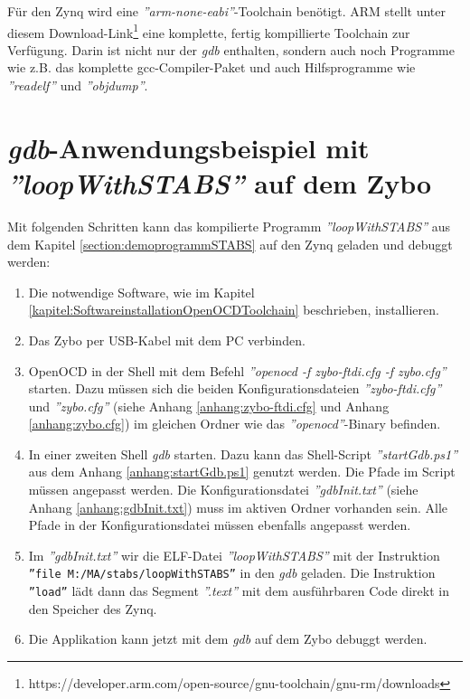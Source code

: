 Für den Zynq wird eine \textit{''arm-none-eabi''}-Toolchain benötigt.
ARM stellt unter diesem Download-Link\footnote{https://developer.arm.com/open-source/gnu-toolchain/gnu-rm/downloads} eine komplette, fertig kompillierte Toolchain zur Verfügung.
Darin ist nicht nur der \textit{gdb} enthalten, sondern auch noch Programme wie z.B. das komplette gcc-Compiler-Paket und auch Hilfsprogramme wie \textit{''readelf''} und \textit{''objdump''}.




\section{\textit{gdb}-Anwendungsbeispiel mit \textit{''loopWithSTABS''} auf dem Zybo}
\label{section:anwendungsbeispielGdb}
Mit folgenden Schritten kann das kompilierte Programm \textit{''loopWithSTABS''} aus dem Kapitel \ref{section:demoprogrammSTABS} auf den Zynq geladen und debuggt werden:

\begin{enumerate}
	\item Die notwendige Software, wie im Kapitel \ref{kapitel:SoftwareinstallationOpenOCDToolchain} beschrieben, installieren.
	\item Das Zybo per USB-Kabel mit dem PC verbinden.
	\item OpenOCD in der Shell mit dem Befehl \textit{''openocd -f zybo-ftdi.cfg -f zybo.cfg''} starten.
	       Dazu müssen sich die beiden Konfigurationsdateien \textit{''zybo-ftdi.cfg''} und \textit{''zybo.cfg''} (siehe Anhang \ref{anhang:zybo-ftdi.cfg} und Anhang \ref{anhang:zybo.cfg}) im gleichen Ordner wie das \textit{''openocd''}-Binary befinden.
	\item In einer zweiten Shell \textit{gdb} starten.
	       Dazu kann das Shell-Script \textit{''startGdb.ps1''} aus dem Anhang \ref{anhang:startGdb.ps1} genutzt werden.
	       Die Pfade im Script müssen angepasst werden.
	       Die Konfigurationsdatei \textit{''gdbInit.txt''} (siehe Anhang \ref{anhang:gdbInit.txt}) muss im aktiven Ordner vorhanden sein.
	       Alle Pfade in der Konfigurationsdatei müssen ebenfalls angepasst werden.
	\item Im \textit{''gdbInit.txt''} wir die ELF-Datei \textit{''loopWithSTABS''} mit der Instruktion \texttt{''file M:/MA/stabs/loopWithSTABS''} in den \textit{gdb} geladen. Die Instruktion \texttt{''load''} lädt dann das Segment \textit{''.text''} mit dem ausführbaren Code direkt in den Speicher des Zynq.
	\item Die Applikation kann jetzt mit dem \textit{gdb} auf dem Zybo debuggt werden.
\end{enumerate}


